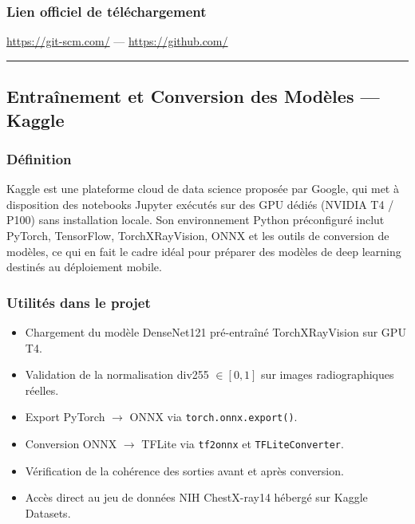 \documentclass[12pt,a4paper]{report}
\begin{document}
\subsubsection*{Lien officiel de téléchargement}
\url{https://git-scm.com/} \quad --- \quad \url{https://github.com/}

\medskip\hrule\medskip

\subsection{Entraînement et Conversion des Modèles --- Kaggle}

\noindent\begin{minipage}[t]{0.66\textwidth}
\subsubsection*{Définition}
Kaggle est une plateforme cloud de data science proposée par Google, qui met à disposition des notebooks Jupyter exécutés sur des GPU dédiés (NVIDIA T4 / P100) sans installation locale. Son environnement Python préconfiguré inclut PyTorch, TensorFlow, TorchXRayVision, ONNX et les outils de conversion de modèles, ce qui en fait le cadre idéal pour préparer des modèles de deep learning destinés au déploiement mobile.
\end{minipage}\hfill
\begin{minipage}[t]{0.30\textwidth}
\vspace{0pt}
\begin{center}
\end{center}
\end{minipage}

\subsubsection*{Utilités dans le projet}
\begin{itemize}
  \item Chargement du modèle DenseNet121 pré-entraîné TorchXRayVision sur GPU T4.
  \item Validation de la normalisation div255 $\in [0,1]$ sur images radiographiques réelles.
  \item Export PyTorch $\rightarrow$ ONNX via \texttt{torch.onnx.export()}.
  \item Conversion ONNX $\rightarrow$ TFLite via \texttt{tf2onnx} et \texttt{TFLiteConverter}.
  \item Vérification de la cohérence des sorties avant et après conversion.
  \item Accès direct au jeu de données NIH ChestX-ray14 hébergé sur Kaggle Datasets.
\end{itemize}
\end{document}
